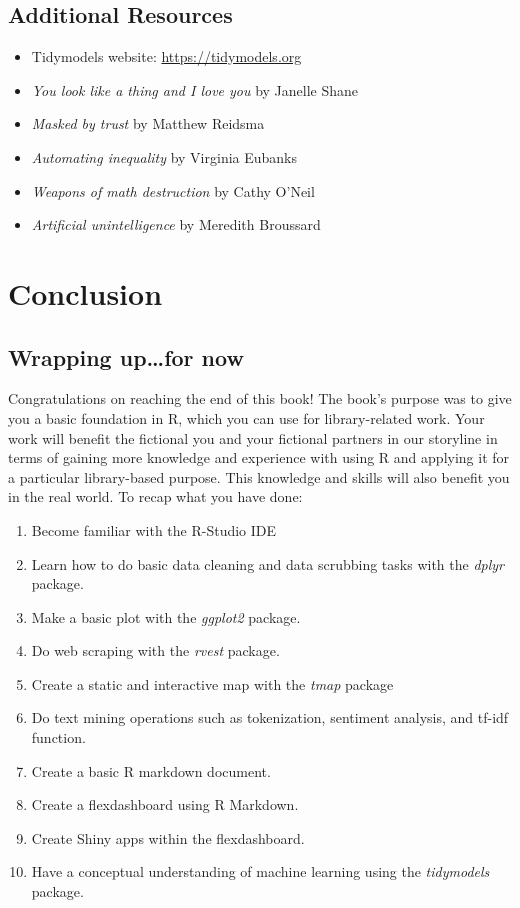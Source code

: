 \documentclass[
  krantz2]{krantz}
\providecommand{\tightlist}{%
  \setlength{\itemsep}{0pt}\setlength{\parskip}{0pt}}
\begin{document}
\hypertarget{ml-resources}{%
\section{Additional Resources}\label{ml-resources}}

\begin{itemize}
\tightlist
\item
  Tidymodels website: \url{https://tidymodels.org}
\item
  \emph{You look like a thing and I love you} by Janelle Shane
\item
  \emph{Masked by trust} by Matthew Reidsma
\item
  \emph{Automating inequality} by Virginia Eubanks
\item
  \emph{Weapons of math destruction} by Cathy O'Neil
\item
  \emph{Artificial unintelligence} by Meredith Broussard
\end{itemize}

\hypertarget{conclusion}{%
\chapter{Conclusion}\label{conclusion}}

\hypertarget{wrapping-upfor-now}{%
\section{Wrapping up\ldots for now}\label{wrapping-upfor-now}}

Congratulations on reaching the end of this book! The book's purpose was to give you a basic foundation in R, which you can use for library-related work. Your work will benefit the fictional you and your fictional partners in our storyline in terms of gaining more knowledge and experience with using R and applying it for a particular library-based purpose. This knowledge and skills will also benefit you in the real world. To recap what you have done:

\begin{enumerate}
\def\labelenumi{\arabic{enumi}.}
\tightlist
\item
  Become familiar with the R-Studio IDE
\item
  Learn how to do basic data cleaning and data scrubbing tasks with the \emph{dplyr} package.
\item
  Make a basic plot with the \emph{ggplot2} package.
\item
  Do web scraping with the \emph{rvest} package.
\item
  Create a static and interactive map with the \emph{tmap} package
\item
  Do text mining operations such as tokenization, sentiment analysis, and tf-idf function.
\item
  Create a basic R markdown document.
\item
  Create a flexdashboard using R Markdown.
\item
  Create Shiny apps within the flexdashboard.
\item
  Have a conceptual understanding of machine learning using the \emph{tidymodels} package.
\end{enumerate}
\end{document}
